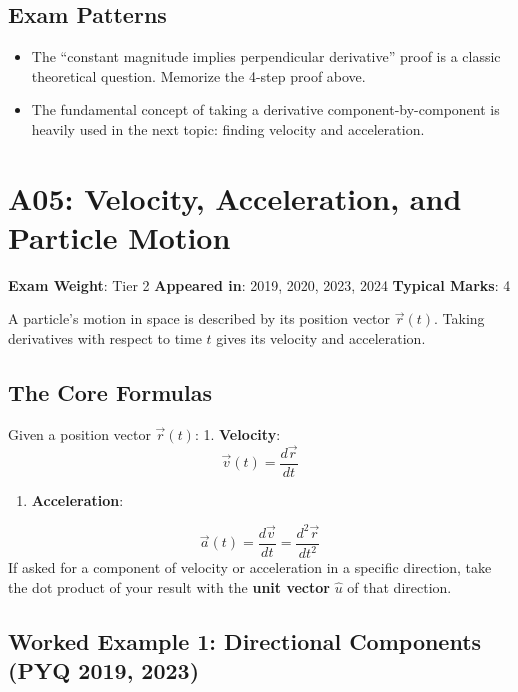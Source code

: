 \documentclass[
]{article}
\providecommand{\tightlist}{%
  \setlength{\itemsep}{0pt}\setlength{\parskip}{0pt}}
\renewenvironment{quote}
  {\begin{tcolorbox}[
     colback=calloutbg,
     colframe=calloutframe,
     colupper=callouttext,
     arc=3pt,
     boxrule=0.5pt,
     leftrule=0.5pt,
     borderline west={3pt}{0pt}{calloutaccent},
     left=8pt,
     right=8pt,
     top=6pt,
     bottom=6pt
   ]}
  {\end{tcolorbox}}
\begin{document}
\subsection{Exam Patterns}\label{exam-patterns-3}

\begin{itemize}
\tightlist
\item
  The ``constant magnitude implies perpendicular derivative'' proof is a
  classic theoretical question. Memorize the 4-step proof above.
\item
  The fundamental concept of taking a derivative component-by-component
  is heavily used in the next topic: finding velocity and acceleration.
\end{itemize}

\section{A05: Velocity, Acceleration, and Particle
Motion}\label{a05-velocity-acceleration-and-particle-motion}

\begin{quote}
\textbf{Exam Weight}: Tier 2 \textbar{} \textbf{Appeared in}: 2019,
2020, 2023, 2024 \textbar{} \textbf{Typical Marks}: 4
\end{quote}

A particle's motion in space is described by its position vector
\(\vec{r}(t)\). Taking derivatives with respect to time \(t\) gives its
velocity and acceleration.

\subsection{The Core Formulas}\label{the-core-formulas}

Given a position vector \(\vec{r}(t)\): 1. \textbf{Velocity}:
\[
\vec{v}(t) = \frac{d\vec{r}}{dt}
\]
\begin{enumerate}
\def\labelenumi{\arabic{enumi}.}
\setcounter{enumi}{1}
\tightlist
\item
  \textbf{Acceleration}:
\end{enumerate}
\[
\vec{a}(t) = \frac{d\vec{v}}{dt} = \frac{d^2\vec{r}}{dt^2}
\]
If asked for a component of velocity or acceleration in a specific
direction, take the dot product of your result with the \textbf{unit
vector} \(\hat{u}\) of that direction.

\subsection{Worked Example 1: Directional Components (PYQ 2019,
2023)}\label{worked-example-1-directional-components-pyq-2019-2023}
\end{document}
